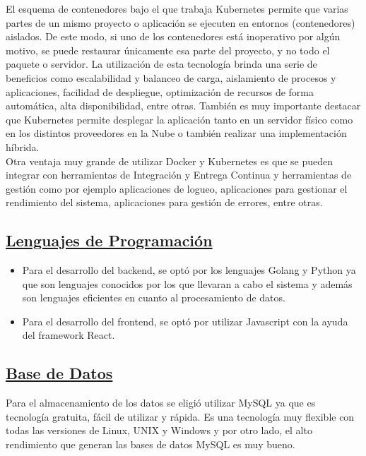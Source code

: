El esquema de contenedores bajo el que trabaja Kubernetes permite que varias partes de un mismo proyecto o aplicación se ejecuten en entornos (contenedores) aislados. De este modo, si uno de los contenedores está inoperativo por algún motivo, se puede restaurar únicamente esa parte del proyecto, y no todo el paquete o servidor. La utilización de esta tecnología brinda una serie de beneficios como escalabilidad y balanceo de carga, aislamiento de procesos y aplicaciones, facilidad de despliegue, optimización de recursos de forma automática, alta disponibilidad, entre otras. También es muy importante destacar que Kubernetes permite desplegar la aplicación tanto en un servidor físico como en los distintos proveedores en la Nube o también realizar una implementación híbrida.\\

Otra ventaja muy grande de utilizar Docker y Kubernetes es que se pueden integrar con herramientas de Integración y Entrega Continua y herramientas de gestión como por ejemplo aplicaciones de logueo, aplicaciones para gestionar el rendimiento del sistema, aplicaciones para gestión de errores, entre otras.\\


\subsection*{\underline{Lenguajes de Programación}}
\begin{itemize}
\item Para el desarrollo del backend, se optó por los lenguajes Golang y Python ya que son lenguajes conocidos por los que llevaran a cabo el sistema y además son lenguajes eficientes en cuanto al procesamiento de datos.
\item Para el desarrollo del frontend, se optó por utilizar Javascript con la ayuda del framework React.\\
\end{itemize}

\subsection*{\underline{Base de Datos}}

Para el almacenamiento de los datos se eligió utilizar MySQL ya que es tecnología gratuita, fácil de utilizar y rápida. Es una tecnología muy flexible con todas las versiones de Linux, UNIX y Windows y por otro lado, el alto rendimiento que generan las bases de datos MySQL es muy bueno.\\

